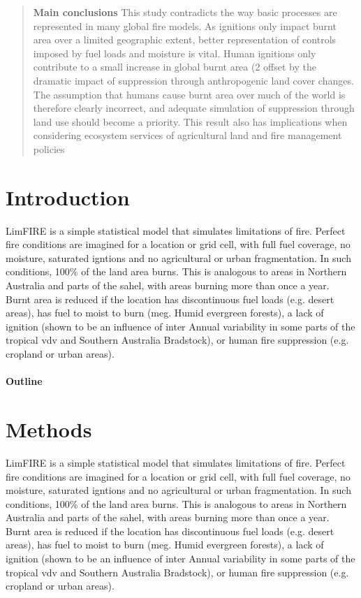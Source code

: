 \documentclass[12pt]{article}
\begin{document}
\begin{abstract}
    \textbf{Main conclusions}
    This study contradicts the way basic processes are represented in many global fire models.
    As ignitions only impact burnt area over a limited geographic extent, better representation of controls imposed by fuel loads and moisture is vital. Human ignitions only contribute to a small increase in global burnt area (2%
    offset by the dramatic impact of suppression through anthropogenic land cover changes.
    The assumption
    that humans cause burnt area over much of the world is therefore clearly incorrect, and adequate simulation
    of suppression through land use should become a priority. This result also has implications when considering
    ecosystem services of agricultural land and fire management policies
\end{abstract}


\section{Introduction}
LimFIRE is a simple statistical model that simulates limitations of fire. Perfect fire conditions are imagined for a location or grid cell, with full fuel coverage, no moisture, saturated igntions and no agricultural or urban fragmentation. In such conditions, 100\% of the land area burns. This is analogous to areas in Northern Australia and parts of the sahel, with areas burning more than once a year. Burnt area is reduced if the location has discontinuous fuel loads  (e.g. desert areas), has fuel to moist to burn (meg. Humid evergreen forests), a lack of ignition (shown to be an influence of inter Annual variability in some parts of the tropical vdv and Southern Australia Bradstock), or human fire suppression (e.g. cropland or urban areas).

\paragraph{Outline}

\section{Methods}
LimFIRE is a simple statistical model that simulates limitations of fire. Perfect fire conditions are imagined for a location or grid cell, with full fuel coverage, no moisture, saturated igntions and no agricultural or urban fragmentation. In such conditions, 100\% of the land area burns. This is analogous to areas in Northern Australia and parts of the sahel, with areas burning more than once a year. Burnt area is reduced if the location has discontinuous fuel loads  (e.g. desert areas), has fuel to moist to burn (meg. Humid evergreen forests), a lack of ignition (shown to be an influence of inter Annual variability in some parts of the tropical vdv and Southern Australia Bradstock), or human fire suppression (e.g. cropland or urban areas).
\end{document}
